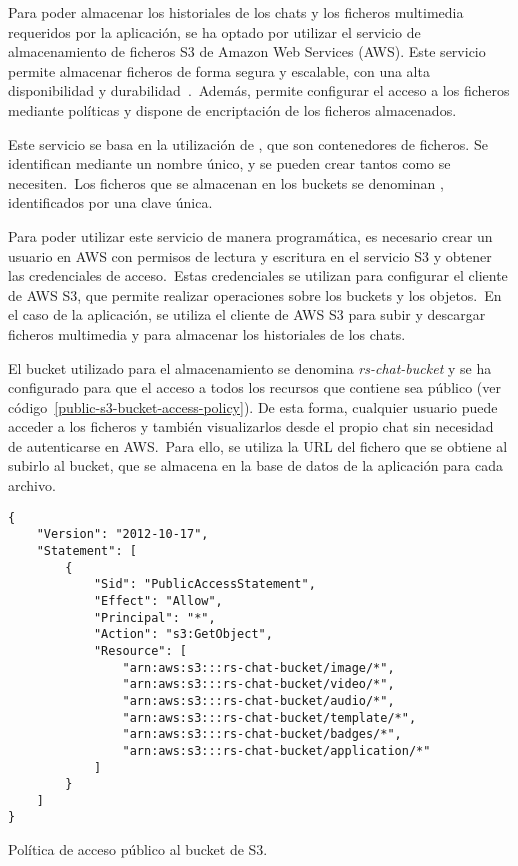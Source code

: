 
Para poder almacenar los historiales de los chats y los ficheros multimedia requeridos por la aplicación, se ha
optado por utilizar el servicio de almacenamiento de ficheros S3 de Amazon Web Services (AWS).
Este servicio permite almacenar ficheros de forma segura y escalable, con una alta disponibilidad
y durabilidad~\cite{AWSAlmac67:online}.\ Además, permite configurar el acceso a los ficheros mediante políticas
y dispone de encriptación de los ficheros almacenados.

Este servicio se basa en la utilización de , que son contenedores de ficheros.
Se identifican mediante un nombre único, y se pueden crear tantos como se necesiten.\ Los ficheros que se almacenan
en los buckets se denominan , identificados por una clave única.

Para poder utilizar este servicio de manera programática, es necesario crear un usuario en AWS con permisos de lectura
y escritura en el servicio S3 y obtener las credenciales de acceso.\ Estas credenciales se utilizan para configurar
el cliente de AWS S3, que permite realizar operaciones sobre los buckets y los objetos.\ En el caso de la aplicación,
se utiliza el cliente de AWS S3 para subir y descargar ficheros multimedia y para almacenar los historiales de los
chats.

El bucket utilizado para el almacenamiento se denomina \textit{rs-chat-bucket} y se ha configurado para que el acceso
a todos los recursos que contiene sea público (ver código~\ref{public-s3-bucket-access-policy}).
De esta forma, cualquier usuario puede acceder a los ficheros y también
visualizarlos desde el propio chat sin necesidad de autenticarse en AWS.\ Para ello, se utiliza la URL del fichero
que se obtiene al subirlo al bucket, que se almacena en la base de datos de la aplicación para cada archivo.

\begin{codeBlock}
	\begin{verbatim}
{
    "Version": "2012-10-17",
    "Statement": [
        {
            "Sid": "PublicAccessStatement",
            "Effect": "Allow",
            "Principal": "*",
            "Action": "s3:GetObject",
            "Resource": [
                "arn:aws:s3:::rs-chat-bucket/image/*",
                "arn:aws:s3:::rs-chat-bucket/video/*",
                "arn:aws:s3:::rs-chat-bucket/audio/*",
                "arn:aws:s3:::rs-chat-bucket/template/*",
                "arn:aws:s3:::rs-chat-bucket/badges/*",
                "arn:aws:s3:::rs-chat-bucket/application/*"
            ]
        }
    ]
}
	\end{verbatim}
	\caption{Política de acceso público al bucket de S3.}
	\label{public-s3-bucket-access-policy}
\end{codeBlock}

